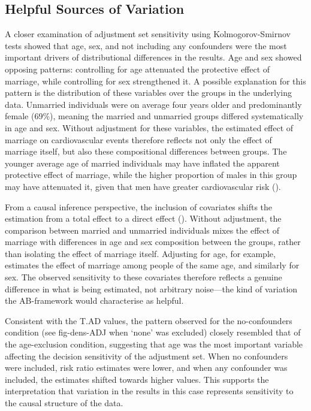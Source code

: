 \documentclass[
  man,
  floatsintext,
  longtable,
  nolmodern,
  notxfonts,
  notimes,
  colorlinks=true,linkcolor=blue,citecolor=blue,urlcolor=blue]{apa7}
\begin{document}
\subsection{Helpful Sources of
Variation}\label{helpful-sources-of-variation}

A closer examination of adjustment set sensitivity using
Kolmogorov-Smirnov tests showed that age, sex, and not including any
confounders were the most important drivers of distributional
differences in the results. Age and sex showed opposing patterns:
controlling for age attenuated the protective effect of marriage, while
controlling for sex strengthened it. A possible explanation for this
pattern is the distribution of these variables over the groups in the
underlying data. Unmarried individuals were on average four years older
and predominantly female (69\%), meaning the married and unmarried
groups differed systematically in age and sex. Without adjustment for
these variables, the estimated effect of marriage on cardiovascular
events therefore reflects not only the effect of marriage itself, but
also these compositional differences between groups. The younger average
age of married individuals may have inflated the apparent protective
effect of marriage, while the higher proportion of males in this group
may have attenuated it, given that men have greater cardiovascular risk
().

From a causal inference perspective, the inclusion of covariates shifts
the estimation from a total effect to a direct effect
(). Without adjustment,
the comparison between married and unmarried individuals mixes the
effect of marriage with differences in age and sex composition between
the groups, rather than isolating the effect of marriage itself.
Adjusting for age, for example, estimates the effect of marriage among
people of the same age, and similarly for sex. The observed sensitivity
to these covariates therefore reflects a genuine difference in what is
being estimated, not arbitrary noise---the kind of variation the
AB-framework would characterise as helpful.

Consistent with the T.AD values, the pattern observed for the
no-confounders condition (see fig-dens-ADJ when `none' was excluded)
closely resembled that of the age-exclusion condition, suggesting that
age was the most important variable affecting the decision sensitivity
of the adjustment set. When no confounders were included, risk ratio
estimates were lower, and when any confounder was included, the
estimates shifted towards higher values. This supports the
interpretation that variation in the results in this case represents
sensitivity to the causal structure of the data.
\end{document}
